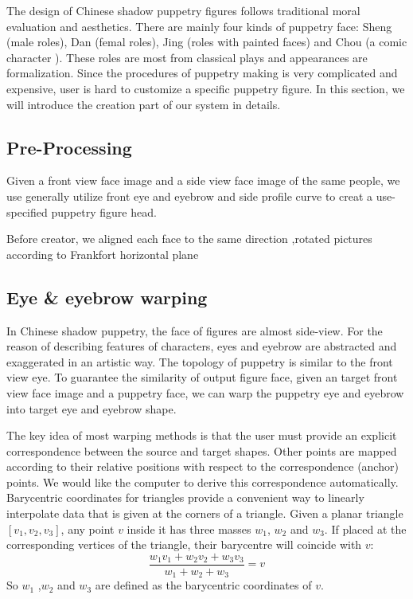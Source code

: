 \documentclass[letter]{sig-alternate}
\begin{document}
The design of Chinese shadow puppetry figures follows traditional moral evaluation and aesthetics. There are mainly four kinds of puppetry face: Sheng (male roles), Dan (femal roles), Jing (roles with painted faces) and Chou (a comic character ). These roles are most from classical plays and appearances are formalization. Since the procedures of puppetry making is very complicated and expensive, user is hard to customize a specific puppetry figure. In this section, we will introduce the creation part of our system in details.

\subsection{Pre-Processing}

Given a front view face image and a side view face image of the same people, we use generally utilize front eye and eyebrow and side profile curve to creat a use-specified puppetry figure head.

Before creator, we aligned each face to the same direction ,rotated pictures according to Frankfort horizontal plane





\subsection{Eye \& eyebrow warping}

In Chinese shadow puppetry, the face of figures are almost side-view. For the reason of  describing features of characters, eyes and eyebrow are abstracted and exaggerated in an artistic way. The topology of puppetry is similar to the front view eye. To guarantee the similarity of output figure face,  given an target front view face image and a puppetry face, we can warp the puppetry eye and eyebrow into target eye and eyebrow shape.

The key idea of most warping methods \cite{gomes1999warping,hormann2006mean} is that the user must provide an explicit correspondence between the source and target shapes. Other points are mapped according to their relative positions with respect to the correspondence (anchor) points. We would like the computer to derive this correspondence automatically. Barycentric coordinates for triangles provide a convenient way to linearly interpolate data that is given at the corners of a triangle. Given a planar triangle $\left[ v_{1},v_{2},v_{3}\right]$, any point $v$ inside it has three masses $w_{1}$, $w_{2}$ and $w_{3}$. If placed at the corresponding vertices of the  triangle, their barycentre will coincide with $v$:
\begin{equation}
 \dfrac {w_{1}v_{1}+w_{2}v_{2}+w_{3}v_{3}} {w_{1}+w_{2}+w_{3}}=v 
 \end{equation}
So $w_{1}$ ,$w_{2}$ and $w_{3}$ are defined as the barycentric coordinates of $v$.
\end{document}

